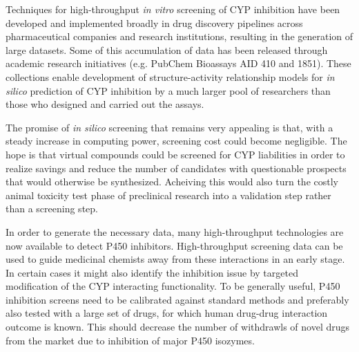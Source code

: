Techniques for high-throughput \textit{in vitro} screening of CYP inhibition have been developed and implemented broadly in drug discovery pipelines across pharmaceutical companies and research institutions, resulting in the generation of large datasets. Some of this accumulation of data has been released through academic research initiatives (e.g. PubChem Bioassays AID 410 and 1851). These collections enable development of structure-activity relationship models for \textit{in silico} prediction of CYP inhibition by a much larger pool of researchers than those who designed and carried out the assays.

The promise of \textit{in silico} screening that remains very appealing is that, with a steady increase in computing power, screening cost could become negligible. The hope is that virtual compounds could be screened for CYP liabilities in order to realize savings and reduce the number of candidates with questionable prospects that would otherwise be synthesized. \cite{Zlokarnik2005} Acheiving this would also turn the costly animal toxicity test phase of preclinical research into a validation step rather than a screening step.




In order to generate the necessary data, many high-throughput technologies are now available to detect P450 inhibitors. High-throughput screening data can be used to guide medicinal chemists away from these interactions in an early stage. In certain cases it might also identify the inhibition issue by targeted modification of the CYP interacting functionality. To be generally useful, P450 inhibition screens need to be calibrated against standard methods and preferably also tested with a large set of drugs, for which human drug-drug interaction outcome is known. \cite{Zlokarnik2005} This should decrease the number of withdrawls of novel drugs from the market due to inhibition of major P450 isozymes.

